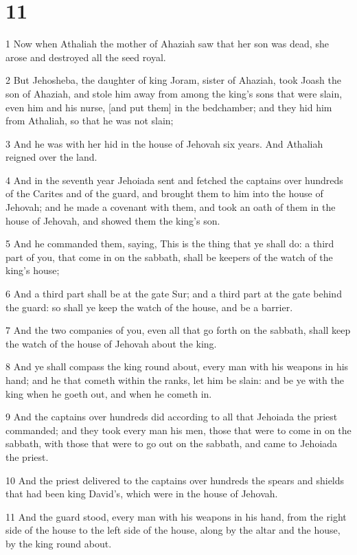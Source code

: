 \chapter{11}

\par 1 Now when Athaliah the mother of Ahaziah saw that her son was dead, she arose and destroyed all the seed royal.
\par 2 But Jehosheba, the daughter of king Joram, sister of Ahaziah, took Joash the son of Ahaziah, and stole him away from among the king's sons that were slain, even him and his nurse, [and put them] in the bedchamber; and they hid him from Athaliah, so that he was not slain;
\par 3 And he was with her hid in the house of Jehovah six years. And Athaliah reigned over the land.
\par 4 And in the seventh year Jehoiada sent and fetched the captains over hundreds of the Carites and of the guard, and brought them to him into the house of Jehovah; and he made a covenant with them, and took an oath of them in the house of Jehovah, and showed them the king's son.
\par 5 And he commanded them, saying, This is the thing that ye shall do: a third part of you, that come in on the sabbath, shall be keepers of the watch of the king's house;
\par 6 And a third part shall be at the gate Sur; and a third part at the gate behind the guard: so shall ye keep the watch of the house, and be a barrier.
\par 7 And the two companies of you, even all that go forth on the sabbath, shall keep the watch of the house of Jehovah about the king.
\par 8 And ye shall compass the king round about, every man with his weapons in his hand; and he that cometh within the ranks, let him be slain: and be ye with the king when he goeth out, and when he cometh in.
\par 9 And the captains over hundreds did according to all that Jehoiada the priest commanded; and they took every man his men, those that were to come in on the sabbath, with those that were to go out on the sabbath, and came to Jehoiada the priest.
\par 10 And the priest delivered to the captains over hundreds the spears and shields that had been king David's, which were in the house of Jehovah.
\par 11 And the guard stood, every man with his weapons in his hand, from the right side of the house to the left side of the house, along by the altar and the house, by the king round about.

